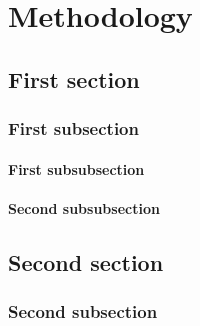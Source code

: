 \chapter{Methodology}

\section{First section}
    

\subsection{First subsection}
    

\subsubsection{First subsubsection}
    

\subsubsection{Second subsubsection}
    

\section{Second section}
    

\subsection{Second subsection}
    
